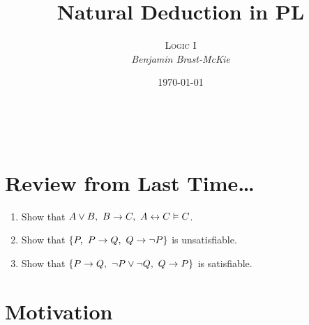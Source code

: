 \documentclass[a4paper, 11pt]{article} %
\title{\textbf{Natural Deduction in PL}} %
\author{\textsc{Logic I}\\ \em Benjamin Brast-McKie} %
\date{\today} %
\makeatletter
\renewcommand{\maketitle}{
\begin{flushright}
{\LARGE\@title}

\vspace{10pt}

{\@author}
\\ \@date
\end{flushright}

\vspace{20pt}

}
\makeatother
\begin{document}
\maketitle %

\thispagestyle{empty}


\section*{Review from Last Time\ldots}

\begin{enumerate}
  \item Show that $A \vee B,\ B \rightarrow C,\ A \leftrightarrow C \vDash C$.
  \item Show that $\{P,\ P \rightarrow Q,\ Q \rightarrow \neg P\}$ is unsatisfiable. 
  \item Show that $\lbrace P \rightarrow Q,\ \neg P \vee \neg Q,\ Q \rightarrow P\rbrace$ is satisfiable.
\end{enumerate}





\section*{Motivation}
\end{document}
